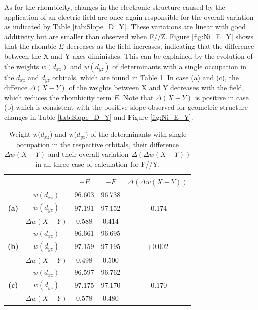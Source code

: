 \documentclass[12pt]{report}
\numberwithin{equation}{section}
\begin{document}
As for the rhombicity, changes in the electronic structure caused by the application of an electric field are once again responsible for the overall variation as indicated by Table \ref{tab:Slope_D_Y}.
These variations are linear with good additivity but are smaller than observed when F//Z. 
Figure \ref{fig:Ni_E_Y} shows that the rhombic $E$ decreases as the field increases, indicating that the difference between the X and Y axes diminishes.
This can be explained by the evolution of the weights $w(d_{xz})$ and $w(d_{yz})$ of determinants with a single occupation in the $d_{xz}$ and $d_{yz}$ orbitals, which are found in Table \ref{tab:PoidsY}.
In case (a) and (c), the diffence $\Delta (X-Y)$ of the weights between X and Y decreases with the field, which reduces the rhombicity term $E$.
Note that $\Delta (X-Y)$ is positive in case (b) which is consistent with the positive slope observed for geometric structure changes in Table \ref{tab:Slope_D_Y} and Figure \ref{fig:Ni_E_Y}.


\begin{table}[h]
    \centering
    \begin{tabular}{c | c | c c | c }
        & &  $-F$ & $-F$ & $\Delta (\Delta w(X-Y))$\\
        \hline
        \multirow{3}{*}{\textbf{(a)}}
        &$w(d_{xz})$ &  96.603 & 96.738 & \\
        &$w(d_{yz})$ &  97.191 & 97.152 & -0.174\\
        &$\Delta w(X-Y)$ & 0.588 & 0.414& \\
        \hline
        \multirow{3}{*}{\textbf{(b)}}
        &$w(d_{xz})$ &  96.661 & 96.695 & \\
        &$w(d_{yz})$ &  97.159 & 97.195 & +0.002\\
        &$\Delta w(X-Y)$ & 0.498 & 0.500& \\
        \hline
        \multirow{3}{*}{\textbf{(c)}}
        &$w(d_{xz})$ &  96.597 & 96.762 & \\
        &$w(d_{yz})$ &  97.175 & 97.170 & -0.170\\
        &$\Delta w(X-Y)$ & 0.578 & 0.480& \\
        \hline
    \end{tabular}
    \caption{Weight w($d_{xz}$) and w($d_{yz})$ of the determinants with single occupation in the respective orbitals, their difference $\Delta w(X-Y)$ and their overall variation $\Delta (\Delta w(X-Y))$ in all three case of calculation for F//Y.}
    \label{tab:PoidsY}
\end{table}
\end{document}
